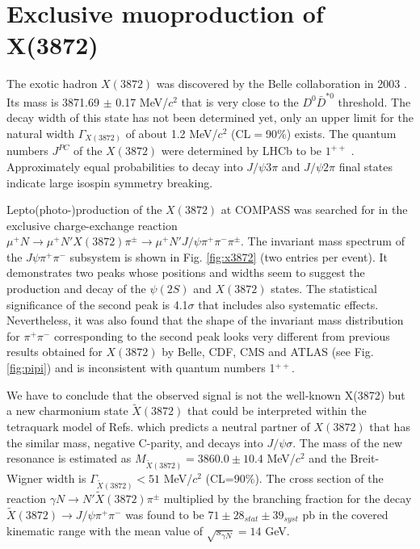 \documentclass[a4paper]{jpconf}
\begin{document}
\section{Exclusive muoproduction of X(3872)}
The exotic hadron $X(3872)$ was discovered by the Belle collaboration in 2003 \cite{x3872belle}. Its mass is 3871.69 $\pm$ 0.17 MeV/$c^2$  that is very close to the $D^0\bar{D}^{*0}$ threshold. The decay width of this state has not been determined yet, only an upper limit for the natural width $\Gamma_{X(3872)}$ of about 1.2 MeV/$c^2$ (CL$=$90\%) exists. The quantum numbers $J^{PC}$ of the $X(3872)$ were determined by LHCb to be $1^{++}$ \cite{x3872LHCB1,x3872LHCB2}. Approximately equal probabilities to decay into $J/\psi3\pi$ and $J/\psi2\pi$  final states indicate large isospin symmetry breaking.

Lepto(photo-)production of the $X(3872)$ at COMPASS was searched for in the exclusive charge-exchange reaction $\mu^+ N \rightarrow \mu^+ N' X(3872)\pi^{\pm}\rightarrow \mu^+ N' J/\psi \pi^+\pi^-\pi^{\pm}$. The invariant mass spectrum of the $J\psi\pi^+\pi^-$ subsystem is shown in Fig. \ref{fig:x3872} (two entries per event). It demonstrates two peaks 
whose positions and widths seem to suggest the production and decay of the $\psi(2S)$ and $X(3872)$ states. The statistical significance of the second peak is 4.1$\sigma$ that includes also systematic effects.
 Nevertheless, it was also found that the shape of the invariant mass distribution for $\pi^+\pi^-$  corresponding to the second peak looks very different from previous results obtained for $X(3872)$  by Belle, CDF, CMS and ATLAS (see Fig. \ref{fig:pipi}) and is inconsistent with quantum numbers 1$^{++}$.
 
We have to conclude that the observed signal is not the well-known X(3872) but a new charmonium state $\widetilde{X}(3872)$ that could be interpreted within the tetraquark model of Refs. \cite{Maiani:2004vq,Maiani:2014aja} which predicts a neutral partner of $X(3872)$ that has the similar mass, negative C-parity, and decays into $J/\psi\sigma$. The mass of the new resonance is estimated as 
$M_{\widetilde{X}(3872)}=3860.0\pm10.4$ MeV/$c^2$ and the Breit-Wigner width is $\Gamma_{\widetilde{X}(3872)}< 51$  
MeV/$c^2$ (CL=90\%). The  cross section of the reaction $\gamma N \rightarrow N' \widetilde{X}(3872)\pi^{\pm}$ multiplied by the branching fraction for the decay $\widetilde{X}(3872)\rightarrow J/\psi\pi^+\pi^-$ was found to be $71\pm28_{stat}\pm39_{syst}$ pb in the covered kinematic range with the mean value of $\sqrt{s_{\gamma N}}=14$ GeV. 
\end{document}
